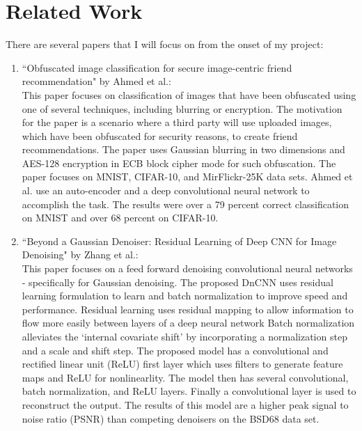 \documentclass[12pt, titlepage]{article}
\begin{document}
\section{Related Work} \label{Related_Work}
There are several papers that I will focus on from the onset of my project:
\begin{enumerate}
	\item ``Obfuscated image classification for secure image-centric friend recommendation" by Ahmed et al.\citep{ahmed2018obfuscated}:\\
	
	This paper focuses on classification of images that have been obfuscated using one of several techniques, including blurring or encryption. The motivation for the paper is a scenario where a third party will use uploaded images, which have been obfuscated for security reasons, to create friend recommendations. The paper uses Gaussian blurring in two dimensions and AES-128 encryption in ECB block cipher mode for such obfuscation. The paper focuses on MNIST, CIFAR-10, and MirFlickr-25K data sets. Ahmed et al. use an auto-encoder and a deep convolutional neural network to accomplish the task. The results were over a 79 percent correct classification on MNIST and over 68 percent on CIFAR-10.\\
	
	
	\item ``Beyond a Gaussian Denoiser: Residual Learning of Deep CNN for Image Denoising" by Zhang et al.\citep{zhang2017beyond}:\\
	
	This paper focuses on a feed forward denoising convolutional neural networks - specifically for Gaussian denoising. The proposed DnCNN uses residual learning formulation to learn and batch normalization to improve speed and performance. Residual learning uses residual mapping to allow information to flow more easily between layers of a deep neural network
	Batch normalization alleviates the `internal covariate shift' by incorporating a normalization step and a scale and shift step. The proposed model has a convolutional and rectified linear unit (ReLU) first layer which uses filters to generate feature maps and ReLU for nonlinearlity. 
	The model then has several convolutional, batch normalization, and ReLU layers. Finally a convolutional layer is used to reconstruct the output. The results of this model are a higher peak signal to noise ratio (PSNR) than competing denoisers on the BSD68 data set. 
\end{enumerate}
\end{document}
